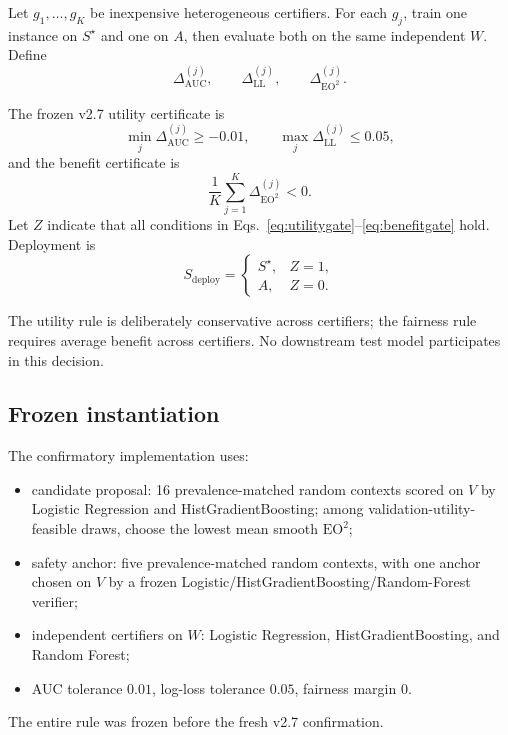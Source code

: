 \documentclass[10pt]{article}
\newcommand{\eo}{\mathrm{EO}^2}
\newcommand{\AUC}{\mathrm{AUC}}
\newcommand{\LL}{\mathrm{LL}}
\begin{document}
Let $g_1,\dots,g_K$ be inexpensive heterogeneous certifiers.
For each $g_j$, train one instance on $S^\star$ and one on $A$, then evaluate both on the same independent $W$.
Define
\begin{equation}
\Delta^{(j)}_{\AUC}, \qquad
\Delta^{(j)}_{\LL}, \qquad
\Delta^{(j)}_{\eo}.
\end{equation}

The frozen v2.7 utility certificate is
\begin{equation}
\min_j \Delta^{(j)}_{\AUC}\ge -0.01,
\qquad
\max_j \Delta^{(j)}_{\LL}\le 0.05,
\label{eq:utilitygate}
\end{equation}
and the benefit certificate is
\begin{equation}
\frac{1}{K}\sum_{j=1}^K \Delta^{(j)}_{\eo}<0.
\label{eq:benefitgate}
\end{equation}
Let $Z$ indicate that all conditions in Eqs.~\eqref{eq:utilitygate}--\eqref{eq:benefitgate} hold.
Deployment is
\begin{equation}
S_{\mathrm{deploy}}=
\begin{cases}
S^\star,&Z=1,\\
A,&Z=0.
\end{cases}
\label{eq:fallback}
\end{equation}

The utility rule is deliberately conservative across certifiers; the fairness rule requires average benefit across certifiers.
No downstream test model participates in this decision.

\subsection{Frozen instantiation}

The confirmatory implementation uses:
\begin{itemize}[leftmargin=*]
    \item candidate proposal: 16 prevalence-matched random contexts scored on $V$ by Logistic Regression and HistGradientBoosting; among validation-utility-feasible draws, choose the lowest mean smooth $\eo$;
    \item safety anchor: five prevalence-matched random contexts, with one anchor chosen on $V$ by a frozen Logistic/HistGradientBoosting/Random-Forest verifier;
    \item independent certifiers on $W$: Logistic Regression, HistGradientBoosting, and Random Forest;
    \item AUC tolerance $0.01$, log-loss tolerance $0.05$, fairness margin $0$.
\end{itemize}
The entire rule was frozen before the fresh v2.7 confirmation.
\end{document}
